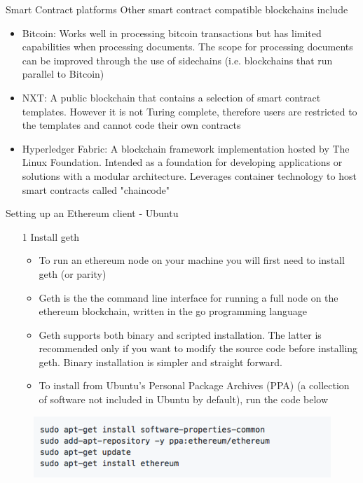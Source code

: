 \documentclass[10pt]{beamer}
\begin{document}

\begin{frame}{Smart Contract platforms}
	Other smart contract compatible blockchains include
	\begin{itemize}
		\item Bitcoin: Works well in processing bitcoin transactions but has limited capabilities when processing documents. The scope for processing documents can be improved through the use of sidechains (i.e. blockchains that run parallel to Bitcoin)
		\item NXT: A public blockchain that contains a selection of smart contract templates. However it is not Turing complete, therefore users are restricted to the templates and cannot code their own contracts
		\item Hyperledger Fabric: A blockchain framework implementation hosted by The Linux Foundation. Intended as a foundation for developing applications or solutions with a modular architecture. Leverages container technology to host smart contracts called "chaincode"
	\end{itemize}
\end{frame}


\begin{frame}{Setting up an Ethereum client - Ubuntu}
	\begin{enumerate}
		\item [1] Install geth
		\begin{itemize}
			\item To run an ethereum node on your machine you will first need to install geth (or parity)
			\item Geth is the the command line interface for running a full node on the ethereum blockchain, written in the go programming language
			\item Geth supports both binary and scripted installation. The latter is recommended only if you want to modify the source code before installing geth. Binary installation is simpler and straight forward.
			\item To install from Ubuntu's Personal Package Archives (PPA) (a collection of software not included in Ubuntu by default), run the code below
		\end{itemize}
	\end{enumerate}
	\begin{figure}[]
		\centering
		\includegraphics  [scale=0.5]{Images/geth1}
	\end{figure}
\end{frame}
\end{document}
